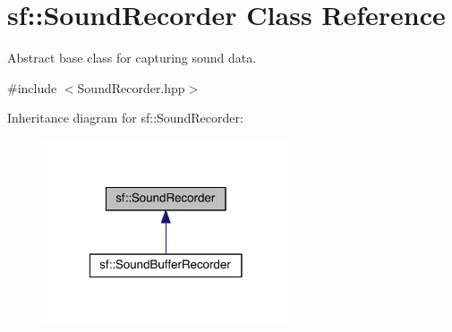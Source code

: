 \hypertarget{classsf_1_1_sound_recorder}{\section{sf\-:\-:Sound\-Recorder Class Reference}
\label{classsf_1_1_sound_recorder}
}


Abstract base class for capturing sound data.  




{\ttfamily \#include $<$Sound\-Recorder.\-hpp$>$}



Inheritance diagram for sf\-:\-:Sound\-Recorder\-:
\nopagebreak
\begin{figure}[H]
\begin{center}
\leavevmode
\includegraphics[width=206pt]{classsf_1_1_sound_recorder__inherit__graph}
\end{center}
\end{figure}
